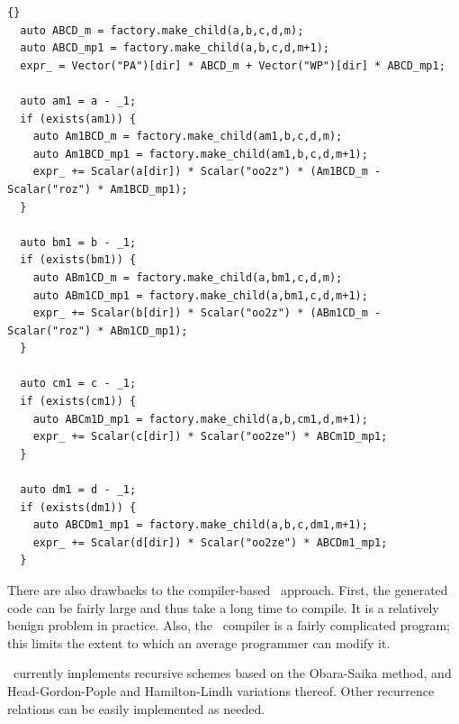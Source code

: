 \documentclass[10pt]{article}
\begin{document}
\begin{lstlisting}[label=lst:osrrcode,caption=Example specification of an
Obara-Saika recurrence relation in \LIBINT\ compiler (see {\tt
src/bin/libint2/vrr\_11\_twoprep\_11.h}).
The corresponding mathematical expression is shown in Eq. \eqref{eq:osvrrA}]{}
  auto ABCD_m = factory.make_child(a,b,c,d,m);
  auto ABCD_mp1 = factory.make_child(a,b,c,d,m+1);
  expr_ = Vector("PA")[dir] * ABCD_m + Vector("WP")[dir] * ABCD_mp1;
  
  auto am1 = a - _1;
  if (exists(am1)) {
    auto Am1BCD_m = factory.make_child(am1,b,c,d,m);
    auto Am1BCD_mp1 = factory.make_child(am1,b,c,d,m+1);
    expr_ += Scalar(a[dir]) * Scalar("oo2z") * (Am1BCD_m - Scalar("roz") * Am1BCD_mp1);
  }

  auto bm1 = b - _1;
  if (exists(bm1)) {
    auto ABm1CD_m = factory.make_child(a,bm1,c,d,m);
    auto ABm1CD_mp1 = factory.make_child(a,bm1,c,d,m+1);
    expr_ += Scalar(b[dir]) * Scalar("oo2z") * (ABm1CD_m - Scalar("roz") * ABm1CD_mp1);
  }

  auto cm1 = c - _1;
  if (exists(cm1)) {
    auto ABCm1D_mp1 = factory.make_child(a,b,cm1,d,m+1);
    expr_ += Scalar(c[dir]) * Scalar("oo2ze") * ABCm1D_mp1;
  }

  auto dm1 = d - _1;
  if (exists(dm1)) {
    auto ABCDm1_mp1 = factory.make_child(a,b,c,dm1,m+1);
    expr_ += Scalar(d[dir]) * Scalar("oo2ze") * ABCDm1_mp1;
  }
\end{lstlisting}

There are also drawbacks to the compiler-based \LIBINT\ approach. First, the
generated code can be fairly large and thus take a long time to compile.
It is a relatively benign problem in practice.
Also, the \LIBINT\ compiler is a fairly complicated program; this
limits the extent to which an average programmer can modify it.

\LIBINT\ currently implements recursive schemes based on the Obara-Saika method,\cite{Obara86, Obara88}
and Head-Gordon-Pople\cite{Head-Gordon88} and Hamilton-Lindh variations thereof.\cite{Hamilton91,Lindh91}
Other recurrence relations can be easily implemented as needed.
\end{document}

